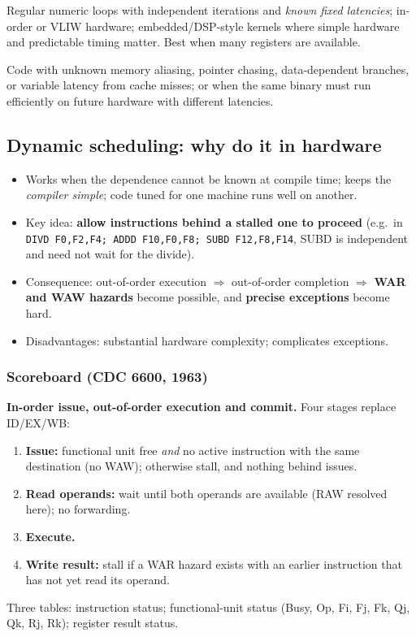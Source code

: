 \begin{pick}
Regular numeric loops with independent iterations and \emph{known fixed latencies}; in-order or VLIW hardware; embedded/DSP-style kernels where simple hardware and predictable timing matter. Best when many registers are available.
\end{pick}
\begin{avoid}
Code with unknown memory aliasing, pointer chasing, data-dependent branches, or variable latency from cache misses; or when the same binary must run efficiently on future hardware with different latencies.
\end{avoid}
\bigskip
{}

\subsection{Dynamic scheduling: why do it in hardware}
\begin{itemize}
\item Works when the dependence cannot be known at compile time; keeps the \emph{compiler simple}; code tuned for one machine runs well on another.
\item Key idea: \textbf{allow instructions behind a stalled one to proceed} (e.g.\ in \texttt{DIVD F0,F2,F4; ADDD F10,F0,F8; SUBD F12,F8,F14}, SUBD is independent and need not wait for the divide).
\item Consequence: out-of-order execution $\Rightarrow$ out-of-order completion $\Rightarrow$ \textbf{WAR and WAW hazards} become possible, and \textbf{precise exceptions} become hard.
\item Disadvantages: substantial hardware complexity; complicates exceptions.
\end{itemize}

\subsubsection{Scoreboard (CDC 6600, 1963)}
\textbf{In-order issue, out-of-order execution and commit.} Four stages replace ID/EX/WB:
\begin{enumerate}
\item \textbf{Issue:} functional unit free \emph{and} no active instruction with the same destination (no WAW); otherwise stall, and nothing behind issues.
\item \textbf{Read operands:} wait until both operands are available (RAW resolved here); no forwarding.
\item \textbf{Execute.}
\item \textbf{Write result:} stall if a WAR hazard exists with an earlier instruction that has not yet read its operand.
\end{enumerate}
Three tables: instruction status; functional-unit status (Busy, Op, Fi, Fj, Fk, Qj, Qk, Rj, Rk); register result status.

